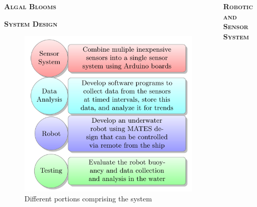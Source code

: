 \documentclass[final,t]{beamer}
\begin{document}
\begin{frame}{}
\begin{columns}
\begin{column}{.33\linewidth}
\begin{block}{\textsc{\textbf{Algal Blooms}}}
                    \vspace*{2mm}
                \end{block}
                \begin{alertblock}{\textsc{\textbf{System Design}}}
					   \begin{figure}
                    		\includegraphics[scale = 3.7]{assets/diagram.jpg}
                    	\caption{Different portions comprising the system}
                    	\end{figure}
                \end{alertblock}

            \end{column}
            \begin{column}{.34\linewidth}
                \begin{alertblock}{\textsc{\textbf{Robotic and Sensor System}}}
                    \vspace*{2mm}


\end{alertblock}
\end{column}
\end{columns}
\end{frame}
\end{document}

